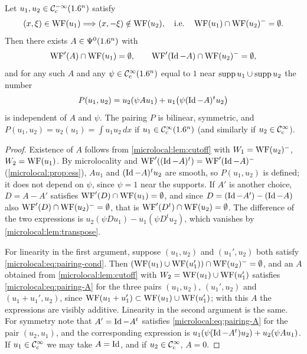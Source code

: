 \begin{proposition}[Pairing]\label{microlocal:prop:pairing}
  Let $u_1,u_2\in\mathcal{C}^{-\infty}_{\mathrm{c}}(1.6^n)$ satisfy
  \begin{equation}\label{microlocal:eq:pairing-cond}
    (x,\xi)\in\operatorname{WF}(u_1)\Longrightarrow(x,-\xi)\notin\operatorname{WF}(u_2),
    \quad\text{i.e.}\quad\operatorname{WF}(u_1)\cap\operatorname{WF}(u_2)^-=\emptyset.
  \end{equation}
  Then there exists $A\in\Psi^{0}(1.6^n)$ with
  \begin{equation}\label{microlocal:eq:pairing-A}
    \operatorname{WF}'(A)\cap\operatorname{WF}(u_1)=\emptyset,\qquad\operatorname{WF}'(\operatorname{Id}-A)\cap\operatorname{WF}(u_2)^-=\emptyset,
  \end{equation}
  and for any such $A$ and any $\psi\in\mathcal{C}^\infty_{\mathrm{c}}(1.6^n)$ equal to $1$ near $\operatorname{supp}
  u_1\cup\operatorname{supp} u_2$ the number
  \begin{equation*}
    P(u_1,u_2)=u_2(\psi Au_1)+u_1\bigl(\psi(\operatorname{Id}-A)^tu_2\bigr)
  \end{equation*}
  is independent of $A$ and $\psi$. The pairing $P$ is bilinear, symmetric,
  and $P(u_1,u_2)=u_2(u_1)=\int u_1u_2\,dx$ if $u_1\in\mathcal{C}^\infty_{\mathrm{c}}(1.6^n)$ (and similarly
  if $u_2\in\mathcal{C}^\infty_{\mathrm{c}}$).
\end{proposition}
\begin{proof}
  Existence of $A$ follows from \cref{microlocal:lem:cutoff} with
  $W_1=\operatorname{WF}(u_2)^-$, $W_2=\operatorname{WF}(u_1)$. By microlocality and
  $\operatorname{WF}'((\operatorname{Id}-A)^t)=\operatorname{WF}'(\operatorname{Id}-A)^-$ (\cref{microlocal:prop:ess}), $Au_1$ and
  $(\operatorname{Id}-A)^tu_2$ are smooth, so $P(u_1,u_2)$ is defined; it does not depend
  on $\psi$, since $\psi=1$ near the supports. If $A'$ is another choice, $D=A-A'$ satisfies
  $\operatorname{WF}'(D)\cap\operatorname{WF}(u_1)=\emptyset$, and since $D=(\operatorname{Id}-A')-(\operatorname{Id}-A)$ also
  $\operatorname{WF}'(D)\cap\operatorname{WF}(u_2)^-=\emptyset$, that is
  $\operatorname{WF}'(D^t)\cap\operatorname{WF}(u_2)=\emptyset$. The difference of the two expressions is
  $u_2(\psi Du_1)-u_1(\psi D^tu_2)$, which vanishes by
  \cref{microlocal:lem:transpose}.

  For linearity in the first argument, suppose $(u_1,u_2)$ and $(u_1',u_2)$
  both satisfy \eqref{microlocal:eq:pairing-cond}. Then
  $(\operatorname{WF}(u_1)\cup\operatorname{WF}(u_1'))\cap\operatorname{WF}(u_2)^-=\emptyset$, and an $A$ obtained from
  \cref{microlocal:lem:cutoff} with $W_2=\operatorname{WF}(u_1)\cup\operatorname{WF}(u_1')$ satisfies
  \eqref{microlocal:eq:pairing-A} for the three pairs $(u_1,u_2)$,
  $(u_1',u_2)$ and $(u_1+u_1',u_2)$, since
  $\operatorname{WF}(u_1+u_1')\subset\operatorname{WF}(u_1)\cup\operatorname{WF}(u_1')$; with this $A$ the expressions are
  visibly additive. Linearity in the second argument is the same. For symmetry note that $A'=\operatorname{Id}-A^t$
  satisfies \eqref{microlocal:eq:pairing-A} for the pair $(u_2,u_1)$, and the
  corresponding expression is $u_1(\psi(\operatorname{Id}-A^t)u_2)+u_2(\psi Au_1)$. If
  $u_1\in\mathcal{C}^\infty_{\mathrm{c}}$ we may take $A=\operatorname{Id}$, and if $u_2\in\mathcal{C}^\infty_{\mathrm{c}}$, $A=0$.
\end{proof}

